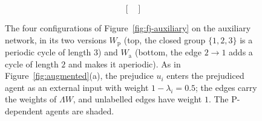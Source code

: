 \begin{figure}[H]
\begin{subfigure}[b]{0.29\textwidth}
\[{\begin{bmatrix}
     \end{bmatrix}} \]
  \caption*{}
  \end{subfigure}
  \caption{The four configurations of Figure~\ref{fig:fj-auxiliary} on the auxiliary network, in its two
  versions $W_{\mathrm{p}}$ (top, the closed group $\{1,2,3\}$ is a periodic cycle of
  length $3$) and $W_{\mathrm{a}}$ (bottom, the edge $2 \to 1$ adds a cycle of length $2$
  and makes it aperiodic). As in Figure~\ref{fig:augmented}(a), the prejudice $u_i$ enters the prejudiced
  agent as an external input with weight $1 - \lambda_i = 0.5$; the edges carry the
  weights of $\Lambda W$, and unlabelled edges have weight $1$. The P-dependent agents are
  shaded.}
  \label{fig:fj-aux-network}
\end{figure}
